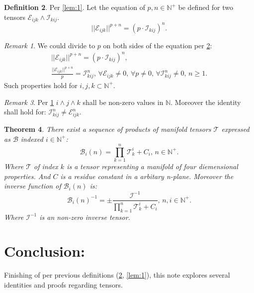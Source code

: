 \documentclass[10pt]{article}
\theoremstyle{plain}
\newtheorem{theorem}{Theorem}[section]
\theoremstyle{definition}
\newtheorem{definition}[theorem]{Definition}
\theoremstyle{remark}
\newtheorem{remark}[theorem]{Remark}
\begin{document}
\begin{definition}
\label{def:1}
Per \ref{lem:1}. Let the equation of $p, n \in \mathbb{N}^{+}$ be defined for two tensors $\mathcal{E}_{ijk} \land \mathcal{I}_{kij}$.
\begin{equation}
	||\mathcal{E}_{ijk}||^{p+n} = (p \cdot \mathcal{I}_{kij})^{n}.
\end{equation}
\begin{remark}
\label{rem:1}
We could divide to $p$ on both sides of the equation per \ref{def:1}:
\begin{align*}
	||\mathcal{E}_{ijk}||^{p+n} = (p \cdot \mathcal{I}_{kij})^{n},\\
	\frac{||\mathcal{E}_{ijk}||^{p+n}}{p} = \mathcal{I}_{kij}^{n}, \, \forall \mathcal{E}_{ijk} \neq 0, \, \forall p \neq 0, \, \forall \mathcal{I}_{kij}^n \neq 0, \, n \geq 1.
\end{align*}
Such properties hold for $i, j, k \subset \mathbb{N}^{+}$.
\end{remark}
\end{definition}
\begin{remark}
	Per \ref{rem:1} $i \land j \land k$ shall be non-zero values in $\mathbb{N}$. Moreover the identity shall hold for: $\mathcal{I}_{kij}^{n} \neq \mathcal{E}_{ijk}^{n}$.
\end{remark}

\begin{theorem}
There exist a sequence of products of manifold tensors $\mathcal{T}$ expressed as $\mathcal{B}$ indexed $i \in \mathbb{N}^{+}$:
\begin{equation}
	\mathcal{B}_{i}(n) = \prod_{k=1}^{n} \mathcal{T}_{k}^{i} + C_{i}, \, n \in \mathbb{N}^{+}.
\end{equation}
Where $\mathcal{T}$ of index $k$ is a tensor representing a manifold of four diemensional properties. And $C$ is a residue constant in a arbitary n-plane. Moreover the inverse function of $\mathcal{B}_{i}(n)$ is:
\begin{equation}
	\mathcal{B}_{i}(n)^{-1} = \pm \frac{\mathcal{I}^{-1}}{\prod_{k=1}^{n} \mathcal{T}_{k}^{i} + C_{i}}, \, n, i \in \mathbb{N}^{+}.
\end{equation}
Where $\mathcal{I}^{-1}$ is an non-zero inverse tensor.
\end{theorem}

\section{Conclusion:}
Finishing of per previous definitions (\ref{def:1}, \ref{lem:1}), this note explores several identities and proofs regarding tensors.

\nocite{*}



\end{document}
